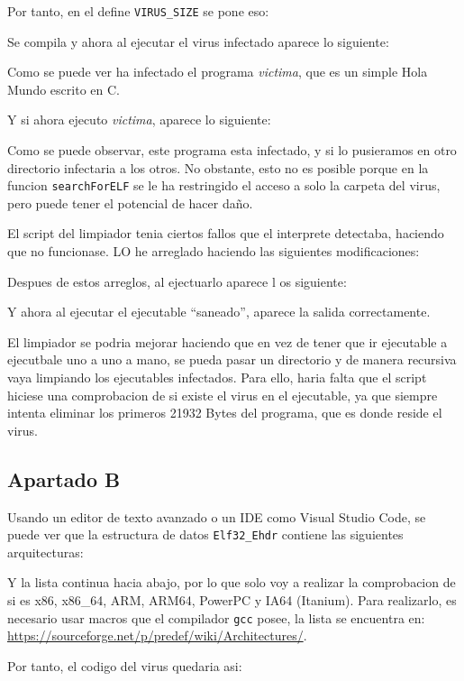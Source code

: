 \documentclass{article}
\begin{document}
Por tanto, en el define \verb|VIRUS_SIZE| se pone eso:


Se compila y ahora al ejecutar el virus infectado aparece lo siguiente:


Como se puede ver ha infectado el programa \textit{victima}, que es un simple Hola Mundo escrito en C.

Y si ahora ejecuto \textit{victima}, aparece lo siguiente:


Como se puede observar, este programa esta infectado, y si lo pusieramos en otro directorio infectaria a los otros. No obstante, esto no es posible porque en la funcion \verb|searchForELF| se le ha restringido el acceso a solo la carpeta del virus, pero puede tener el potencial de hacer daño.



El script del limpiador tenia ciertos fallos que el interprete detectaba, haciendo que no funcionase. LO he arreglado haciendo las siguientes modificaciones: 


Despues de estos arreglos, al ejectuarlo aparece l os siguiente:


Y ahora al ejecutar el ejecutable ``saneado'', aparece la salida correctamente.

El limpiador se podria mejorar haciendo que en vez de tener que ir ejecutable a ejecutbale uno a uno a mano, se pueda pasar un directorio y de manera recursiva vaya limpiando los ejecutables infectados. Para ello, haria falta que el script hiciese una comprobacion de si existe el virus en el ejecutable, ya que siempre intenta eliminar los primeros 21932 Bytes del programa, que es donde reside el virus.

\subsection*{Apartado B}

Usando un editor de texto avanzado o un IDE como Visual Studio Code, se puede ver que la estructura de datos \verb|Elf32_Ehdr| contiene las siguientes arquitecturas:


Y la lista continua hacia abajo, por lo que solo voy a realizar la comprobacion de si es x86, x86\_64, ARM, ARM64, PowerPC y IA64 (Itanium). Para realizarlo, es necesario usar macros que el compilador \verb|gcc| posee, la lista se encuentra en: \url{https://sourceforge.net/p/predef/wiki/Architectures/}.

Por tanto, el codigo del virus quedaria asi:

\end{document}
